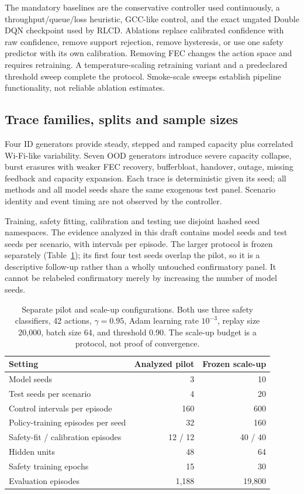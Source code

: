 \documentclass[10pt]{article}
\begin{document}
The mandatory baselines are the conservative controller used continuously, a throughput/queue/loss heuristic, GCC-like control, and the exact ungated Double DQN checkpoint used by RLCD. Ablations replace calibrated confidence with raw confidence, remove support rejection, remove hysteresis, or use one safety predictor with its own calibration. Removing FEC changes the action space and requires retraining. A temperature-scaling retraining variant and a predeclared threshold sweep complete the protocol. Smoke-scale sweeps establish pipeline functionality, not reliable ablation estimates.

\subsection{Trace families, splits and sample sizes}
Four ID generators provide steady, stepped and ramped capacity plus correlated Wi-Fi-like variability. Seven OOD generators introduce severe capacity collapse, burst erasures with weaker FEC recovery, bufferbloat, handover, outage, missing feedback and capacity expansion. Each trace is deterministic given its seed; all methods and all model seeds share the same exogenous test panel. Scenario identity and event timing are not observed by the controller.

Training, safety fitting, calibration and testing use disjoint hashed seed namespaces. The evidence analyzed in this draft contains \EvidenceNumSeeds{} model seeds and \EvidenceNumTraceSeeds{} test seeds per scenario, with \EvidenceHorizon{} intervals per episode. The larger protocol is frozen separately (Table~\ref{tab:protocol}); its first four test seeds overlap the pilot, so it is a descriptive follow-up rather than a wholly untouched confirmatory panel. It cannot be relabeled confirmatory merely by increasing the number of model seeds.

\begin{table}[t]
\centering
\begin{tabular}{lrr}
\toprule
Setting & Analyzed pilot & Frozen scale-up \\
\midrule
Model seeds & 3 & 10 \\
Test seeds per scenario & 4 & 20 \\
Control intervals per episode & 160 & 600 \\
Policy-training episodes per seed & 32 & 160 \\
Safety-fit / calibration episodes & 12 / 12 & 40 / 40 \\
Hidden units & 48 & 64 \\
Safety training epochs & 15 & 30 \\
Evaluation episodes & 1,188 & 19,800 \\
\bottomrule
\end{tabular}
\caption{Separate pilot and scale-up configurations. Both use three safety classifiers, 42 actions, $\gamma=0.95$, Adam learning rate $10^{-3}$, replay size 20,000, batch size 64, and threshold 0.90. The scale-up budget is a protocol, not proof of convergence.}\label{tab:protocol}
\end{table}
\end{document}
